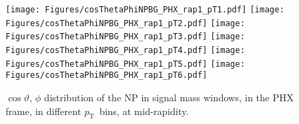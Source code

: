 \documentclass[12pt]{article}
\newcommand{\pt}{$p_{\mathrm{T}}$}
\begin{document}
%
%


\begin{figure}[htbp]
\centering
\texttt{[image: Figures/cosThetaPhiNPBG\_PHX\_rap1\_pT1.pdf]}
\texttt{[image: Figures/cosThetaPhiNPBG\_PHX\_rap1\_pT2.pdf]}
\texttt{[image: Figures/cosThetaPhiNPBG\_PHX\_rap1\_pT3.pdf]}
\texttt{[image: Figures/cosThetaPhiNPBG\_PHX\_rap1\_pT4.pdf]}
\texttt{[image: Figures/cosThetaPhiNPBG\_PHX\_rap1\_pT5.pdf]}
\texttt{[image: Figures/cosThetaPhiNPBG\_PHX\_rap1\_pT6.pdf]}
\caption{$\cos\vartheta,\,\phi$ distribution of the NP in signal mass windows, 
	in the PHX frame, in different \pt\ bins, at mid-rapidity.}
\end{figure}
\clearpage
\end{document}

